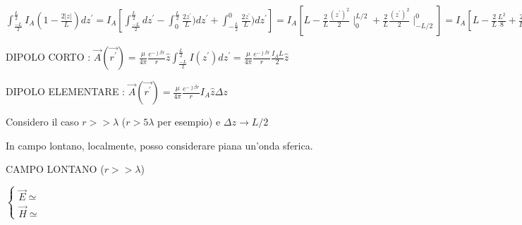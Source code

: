 $\int_{\frac{-L}{2}}^{\frac{L}{2}} I_A (1-\frac{2 \left | z \right |}{L}) dz^{\prime} =  I_A [\int_{\frac{-L}{2}}^{\frac{L}{2}}dz^{\prime}- \int_{0}^{\frac{L}{2}}\frac{2 z^{\prime}}{L}) dz^{\prime}+ \int_{-\frac{L}{2}}^{0}\frac{2 z^{\prime}}{L}) dz^{\prime}] = I_A [L-\frac{2}{L}\frac{(z^{\prime})^{2}}{2}  \mid_{0}^{L/2} + \frac{2}{L}\frac{(z^{\prime})^{2}}{2}  \mid_{-L/2}^{0}] = I_A [L-\frac{2}{L}\frac{L^2}{8} + \frac{2}{L}(-\frac{L^2}{8})] = I_A (L-\frac{L}{4}-\frac{L}{4}) = \frac{I_A L}{2} $

DIPOLO CORTO : $\vec{A}(\vec{r^{\prime}}) = \frac{\mu}{4\pi} \frac{e^{-\jmath\beta r}}{r} \hat{z}\int_{\frac{-L}{2}}^{\frac{L}{2}} I(z^{\prime})dz^{\prime} = \frac{\mu}{4\pi} \frac{e^{-\jmath\beta r}}{r} \frac{I_A L}{2} \hat{z} $

DIPOLO ELEMENTARE : $\vec{A}(\vec{r^{\prime}}) = \frac{\mu}{4\pi} \frac{e^{-\jmath\beta r}}{r} I_A \hat{z} \Delta{z}$

Considero il caso $r >> \lambda$ ($r > 5 \lambda$ per esempio) e $\Delta{z} \to L/2$

In campo lontano, localmente, posso considerare piana un'onda sferica.

CAMPO LONTANO ($r >> \lambda$)

$\begin{cases}\vec{E} \simeq\\
\vec{H} \simeq\end{cases}$
